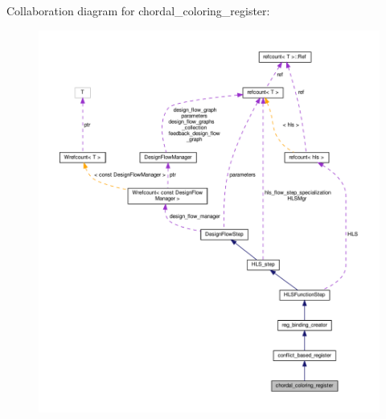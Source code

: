 Collaboration diagram for chordal\+\_\+coloring\+\_\+register\+:
\nopagebreak
\begin{figure}[H]
\begin{center}
\leavevmode
\includegraphics[width=350pt]{df/d7b/classchordal__coloring__register__coll__graph}
\end{center}
\end{figure}
